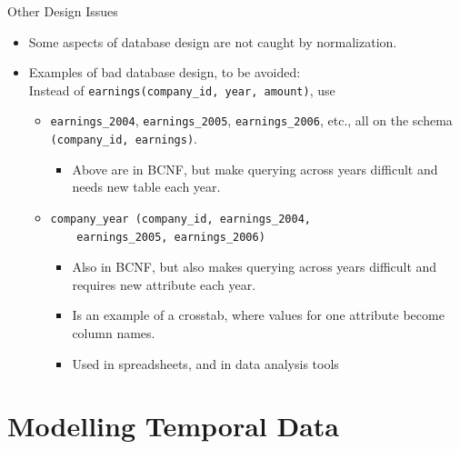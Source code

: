 \documentclass{beamer}
\begin{document}
\begin{frame}[fragile]{Other Design Issues}
    \begin{itemize}
        \item Some aspects of database design are not caught by normalization.
        \item Examples of bad database design, to be avoided:\\
            Instead of \verb|earnings(company_id, year, amount)|, use
            \begin{itemize}
                \item \verb|earnings_2004|, \verb|earnings_2005|, \verb|earnings_2006|, etc., all on the schema \verb|(company_id, earnings)|.
                    \begin{itemize}
                        \item Above are in BCNF, but make querying across years difficult and needs new table each year.
                    \end{itemize}
                \item
                    \begin{verbatim}
company_year (company_id, earnings_2004,
    earnings_2005, earnings_2006)
                    \end{verbatim}
                    \vspace{-3mm}

                    \begin{itemize}
                        \item Also in BCNF, but also makes querying across years difficult and requires new attribute each year.
                        \item Is an example of a crosstab, where values for one attribute become column names.
                        \item Used in spreadsheets, and in data analysis tools
                    \end{itemize}
            \end{itemize}
    \end{itemize}
\end{frame}

\section{Modelling Temporal Data}
\end{document}
